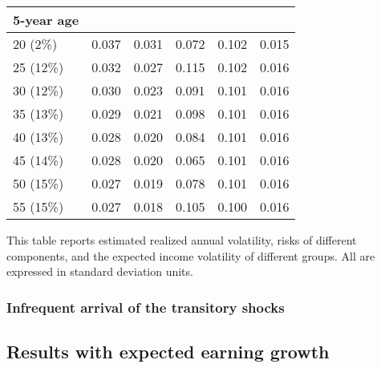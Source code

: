 \begin{table}
{\begin{tabular}{llllll}
				5-year age           &               &                       &                         &               &              \\
					\hline 
				20 (2\%)             & 0.037         & 0.031                 & 0.072                   & 0.102         & 0.015        \\
				25 (12\%)            & 0.032         & 0.027                 & 0.115                   & 0.102         & 0.016        \\
				30 (12\%)            & 0.030         & 0.023                 & 0.091                   & 0.101         & 0.016        \\
				35 (13\%)            & 0.029         & 0.021                 & 0.098                   & 0.101         & 0.016        \\
				40 (13\%)            & 0.028         & 0.020                 & 0.084                   & 0.101         & 0.016        \\
				45 (14\%)            & 0.028         & 0.020                 & 0.065                   & 0.101         & 0.016        \\
				50 (15\%)            & 0.027         & 0.019                 & 0.078                   & 0.101         & 0.016        \\
				55 (15\%)            & 0.027         & 0.018                 & 0.105                   & 0.100         & 0.016        \\
				\hline 
			\end{tabular}
}
	\begin{flushleft} This table reports estimated realized annual volatility, risks of different components, and the expected income volatility of different groups. All are expressed in standard deviation units.\end{flushleft}
\end{table}


\subsubsection{Infrequent arrival of the transitory shocks}

\subsection{Results with expected earning growth}


